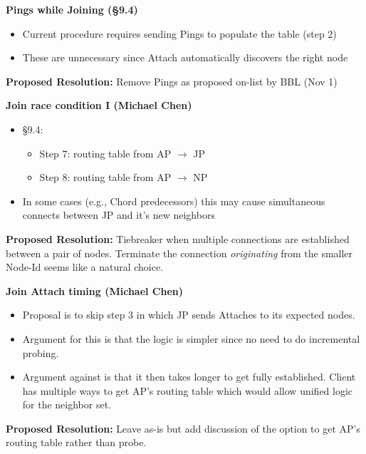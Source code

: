 \documentclass[helvetica]{seminar}
\newcommand{\heading}[1]{%
  \begin{center} 
    \large\bf 
    #1 
  \end{center} 
  \vspace{.4 in}}
\begin{document}
\begin{slide}
\heading{Pings while Joining (\S 9.4)}

\begin{itemize}
\item Current procedure requires sending Pings to populate the table (step 2)
\item These are unnecessary since Attach automatically discovers the right node
\end{itemize}

\vspace{1em}
\textbf{Proposed Resolution:} Remove Pings as proposed on-list by BBL (Nov 1)
\end{slide}



\begin{slide}
\heading{Join race condition I (Michael Chen)}

\begin{itemize}
\item \S 9.4:
\begin{itemize}
\item Step 7: routing table from AP $\rightarrow$ JP
\item Step 8: routing table from AP $\rightarrow$ NP
\end{itemize}
\item In some cases (e.g., Chord predecessors) this may cause
  simultaneous connects between JP and it's new neighbors
\end{itemize}

\vspace{1em}
\textbf{Proposed Resolution:} Tiebreaker when multiple connections are established
between a pair of nodes. Terminate the connection \emph{originating} from the
smaller Node-Id seems like a natural choice.

\end{slide}


\begin{slide}
\heading{Join Attach timing (Michael Chen)}

\begin{itemize}
\item Proposal is to skip step 3 in which JP sends Attaches to 
  its expected nodes.
\item Argument for this is that the logic is simpler since no need
  to do incremental probing.
\item Argument against is that it then takes longer to get fully 
  established. Client has multiple ways to get AP's routing table
  which would allow unified logic for the neighbor set.
\end{itemize}

\vspace{1em}
\textbf{Proposed Resolution:} Leave as-is but add discussion of the
option to get AP's routing table rather than probe.
\end{slide}
\end{document}

